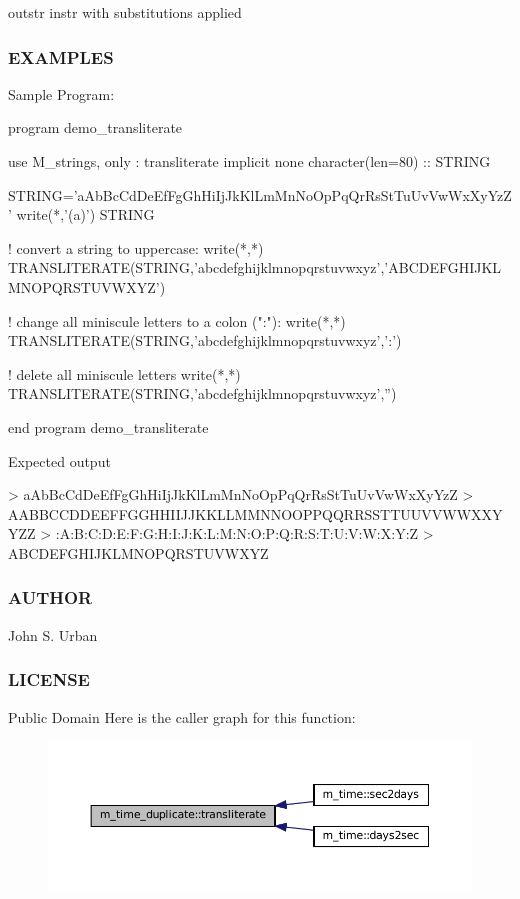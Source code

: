 outstr instr with substitutions applied

\subsubsection*{E\+X\+A\+M\+P\+L\+ES}

\begin{DoxyVerb}Sample Program:

 program demo_transliterate

 use M_strings, only : transliterate
 implicit none
 character(len=80)   :: STRING

 STRING='aAbBcCdDeEfFgGhHiIjJkKlLmMnNoOpPqQrRsStTuUvVwWxXyYzZ'
 write(*,'(a)') STRING

 ! convert a string to uppercase:
 write(*,*) TRANSLITERATE(STRING,'abcdefghijklmnopqrstuvwxyz','ABCDEFGHIJKLMNOPQRSTUVWXYZ')

 ! change all miniscule letters to a colon (":"):
 write(*,*) TRANSLITERATE(STRING,'abcdefghijklmnopqrstuvwxyz',':')

 ! delete all miniscule letters
 write(*,*) TRANSLITERATE(STRING,'abcdefghijklmnopqrstuvwxyz','')

 end program demo_transliterate

Expected output

 > aAbBcCdDeEfFgGhHiIjJkKlLmMnNoOpPqQrRsStTuUvVwWxXyYzZ
 > AABBCCDDEEFFGGHHIIJJKKLLMMNNOOPPQQRRSSTTUUVVWWXXYYZZ
 > :A:B:C:D:E:F:G:H:I:J:K:L:M:N:O:P:Q:R:S:T:U:V:W:X:Y:Z
 > ABCDEFGHIJKLMNOPQRSTUVWXYZ
\end{DoxyVerb}


\subsubsection*{A\+U\+T\+H\+OR}

John S. Urban \subsubsection*{L\+I\+C\+E\+N\+SE}

Public Domain Here is the caller graph for this function\+:\nopagebreak
\begin{figure}[H]
\begin{center}
\leavevmode
\includegraphics[width=350pt]{namespacem__time__duplicate_ac8388a45881cf7c2f9047b4d643ed3f2_icgraph}
\end{center}
\end{figure}
\mbox{\label{namespacem__time__duplicate_ae5ec641c9bdaa5d9377e47310e2165be}} 
